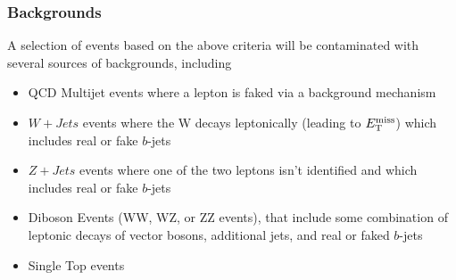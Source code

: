 \subsubsection{Backgrounds}
A selection of events based on the above criteria will be contaminated with several sources of backgrounds, including

\begin{itemize}
\item QCD Multijet events where a lepton is faked via a background mechanism
\item $W+Jets$ events where the W decays leptonically (leading to $E_{\mathrm{T}}^{\mathrm{miss}}$) which includes real or fake $b$-jets
\item $Z+Jets$ events where one of the two leptons isn't identified and which includes real or fake $b$-jets
\item Diboson Events (WW, WZ, or ZZ events), that include some combination of leptonic decays of vector bosons, additional jets, and real or faked $b$-jets
\item Single Top events
\end{itemize}


